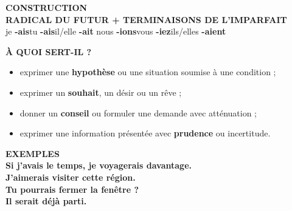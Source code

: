 \documentclass[a4paper,11pt]{article}
\begin{document}
\hspace*{6mm}
\begin{minipage}{0.91\textwidth}
\begin{violetbox}
\textbf{\color{VioletDark}CONSTRUCTION}\\[1mm]
\centering
{\Large \textbf{RADICAL DU FUTUR + TERMINAISONS DE L'IMPARFAIT}}\\[1mm]
\small
je \textbf{-ais}\quad tu \textbf{-ais}\quad il/elle \textbf{-ait}\quad
nous \textbf{-ions}\quad vous \textbf{-iez}\quad ils/elles \textbf{-aient}
\end{violetbox}

\vspace{2.5mm}

\begin{center}
\end{center}

\vspace{1.5mm}

\begin{violetbox}
\textbf{\color{VioletDark}À QUOI SERT-IL ?}\\[1mm]
\begin{itemize}
\setlength{\itemsep}{0.4mm}
\item exprimer une \textbf{hypothèse} ou une situation soumise à une condition ;
\item exprimer un \textbf{souhait}, un désir ou un rêve ;
\item donner un \textbf{conseil} ou formuler une demande avec atténuation ;
\item exprimer une information présentée avec \textbf{prudence} ou incertitude.
\end{itemize}
\end{violetbox}

\vspace{2mm}

\begin{violetbox}
\textbf{\color{VioletDark}EXEMPLES}\\[1mm]
\textbf{Si j'avais le temps, je voyagerais davantage.}\\
\textbf{J'aimerais visiter cette région.}\\
\textbf{Tu pourrais fermer la fenêtre ?}\\
\textbf{Il serait déjà parti.}
\end{violetbox}


\end{minipage}
\end{document}
